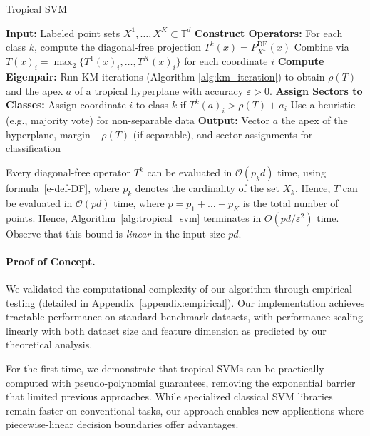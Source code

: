 \documentclass{article}
\newcommand{\trop}{\mathbb{T}}
\begin{document}
\begin{algorithm}
\caption{Tropical SVM}\label{alg:tropical_svm}
\begin{algorithmic}[1]
\STATE \textbf{Input:} Labeled point sets $X^1,\dots,X^K \subset \trop^d$
\STATE \textbf{Construct Operators:}
  \STATE \quad For each class $k$, compute the diagonal-free projection $T^k(x) = P^{\textrm{DF}}_{X^k}(x)$
  \STATE \quad Combine via $T(x)_i = \operatorname{\max}_2\{T^1(x)_i, \dots, T^K(x)_i\}$ for each coordinate $i$
\STATE \textbf{Compute Eigenpair:}
  \STATE \quad Run KM iterations (Algorithm \ref{alg:km_iteration}) to obtain $\rho(T)$ and the apex $a$ of a tropical hyperplane with accuracy $\varepsilon>0$.
\STATE \textbf{Assign Sectors to Classes:}
    \STATE Assign coordinate $i$ to class $k$ if $T^k(a)_i > \rho(T) + a_i$
  \ELSE
    \STATE Use a heuristic (e.g., majority vote) for non-separable data
  \ENDIF
\STATE \textbf{Output:} Vector $a$ the apex of the hyperplane, margin $-\rho(T)$ (if separable), and sector assignments for classification
\end{algorithmic}
\end{algorithm}
Every diagonal-free operator $T^k$ can be evaluated in $\mathcal{O}(p_k d)$ time, using formula~\eqref{e-def-DF},
where $p_k$ denotes the cardinality of the set $X_k$. Hence, $T$ can be evaluated in
$\mathcal{O}(pd)$ time, where $p=p_1+\dots+p_K$ is the total number of points.
Hence, Algorithm~\ref{alg:tropical_svm} terminates in $O(pd/\varepsilon^2)$ time. Observe
that this bound is {\em linear} in the input size $pd$.

\paragraph{Proof of Concept.}
We validated the computational complexity of our algorithm through empirical testing (detailed in Appendix~\ref{appendix:empirical}). Our implementation achieves tractable performance on standard benchmark datasets, with performance scaling linearly with both dataset size and feature dimension as predicted by our theoretical analysis.

For the first time, we demonstrate that tropical SVMs can be practically computed with pseudo-polynomial guarantees, removing the exponential barrier that limited previous approaches. While specialized classical SVM libraries remain faster on conventional tasks, our approach enables new applications where piecewise-linear decision boundaries offer advantages.
\end{document}
